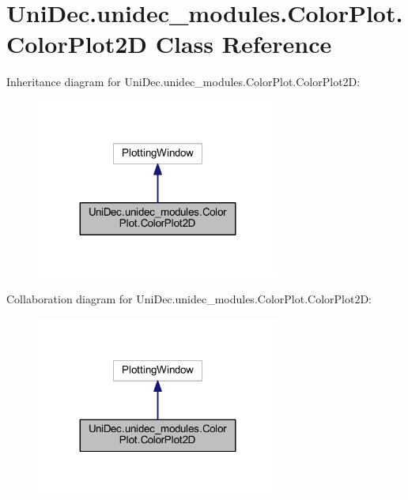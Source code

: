 \hypertarget{class_uni_dec_1_1unidec__modules_1_1_color_plot_1_1_color_plot2_d}{}\section{Uni\+Dec.\+unidec\+\_\+modules.\+Color\+Plot.\+Color\+Plot2\+D Class Reference}
\label{class_uni_dec_1_1unidec__modules_1_1_color_plot_1_1_color_plot2_d}


Inheritance diagram for Uni\+Dec.\+unidec\+\_\+modules.\+Color\+Plot.\+Color\+Plot2\+D\+:\nopagebreak
\begin{figure}[H]
\begin{center}
\leavevmode
\includegraphics[width=227pt]{class_uni_dec_1_1unidec__modules_1_1_color_plot_1_1_color_plot2_d__inherit__graph}
\end{center}
\end{figure}


Collaboration diagram for Uni\+Dec.\+unidec\+\_\+modules.\+Color\+Plot.\+Color\+Plot2\+D\+:\nopagebreak
\begin{figure}[H]
\begin{center}
\leavevmode
\includegraphics[width=227pt]{class_uni_dec_1_1unidec__modules_1_1_color_plot_1_1_color_plot2_d__coll__graph}
\end{center}
\end{figure}
